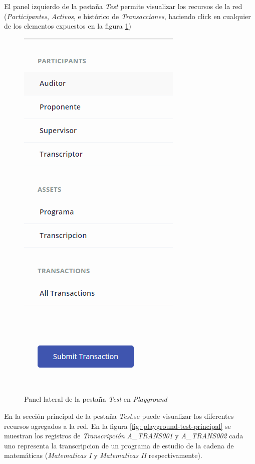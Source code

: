 El panel izquierdo de la pestaña \textit{Test}  permite visualizar los recursos de la red (\textit{Participantes}, \textit{Activos}, e histórico de \textit{Transacciones}, haciendo click en cualquier de los elementos expuestos en la figura \ref{fig: playground-test-sidebar})
\begin{figure}[H]
\centering
\includegraphics[height=0.5\textheight]{playground2.png}
\caption[Test Sidebar Playground]{Panel lateral de la pestaña \textit{Test} en \textit{Playground} }
\label{fig: playground-test-sidebar}
\end{figure}

En la sección principal de la pestaña \textit{Test},se puede visualizar los diferentes recursos agregados a la red. En la figura \ref{fig: playground-test-principal} se muestran los registros de \textit{Transcripción} \textit{A\_TRANS001} y \textit{A\_TRANS002} cada uno representa la transcripcion de un programa de estudio de la cadena de matemáticas (\textit{Matematicas I }y \textit{Matematicas II} respectivamente).

